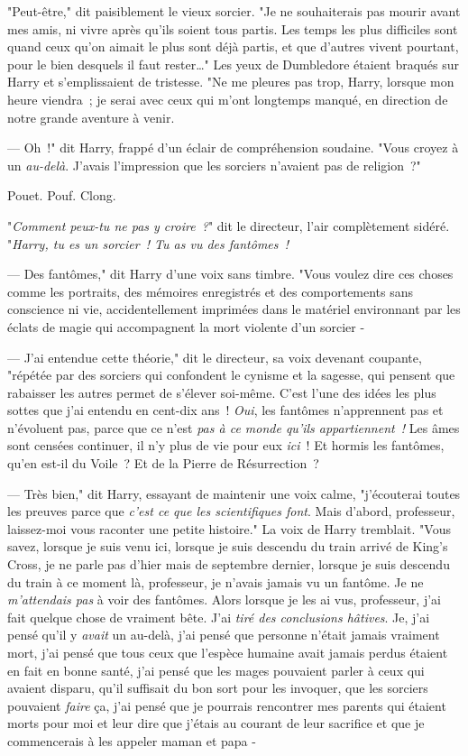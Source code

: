 "Peut-être," dit paisiblement le vieux sorcier. "Je ne souhaiterais pas mourir avant mes amis, ni vivre après qu'ils soient tous partis. Les temps les plus difficiles sont quand ceux qu'on aimait le plus sont déjà partis, et que d'autres vivent pourtant, pour le bien desquels il faut rester…" Les yeux de Dumbledore étaient braqués sur Harry et s'emplissaient de tristesse. "Ne me pleures pas trop, Harry, lorsque mon heure viendra~; je serai avec ceux qui m'ont longtemps manqué, en direction de notre grande aventure à venir.

--- Oh~!" dit Harry, frappé d'un éclair de compréhension soudaine. "Vous croyez à un \emph{au-delà}. J'avais l'impression que les sorciers n'avaient pas de religion~?"

\later

Pouet. Pouf. Clong.

"\emph{Comment peux-tu ne pas y croire~?}" dit le directeur, l'air complètement sidéré. "\emph{Harry, tu es un sorcier~! Tu as vu des fantômes~!}

--- Des fantômes," dit Harry d'une voix sans timbre. "Vous voulez dire ces choses comme les portraits, des mémoires enregistrés et des comportements sans conscience ni vie, accidentellement imprimées dans le matériel environnant par les éclats de magie qui accompagnent la mort violente d'un sorcier -

--- J'ai entendue cette théorie," dit le directeur, sa voix devenant coupante, "répétée par des sorciers qui confondent le cynisme et la sagesse, qui pensent que rabaisser les autres permet de s'élever soi-même. C'est l'une des idées les plus sottes que j'ai entendu en cent-dix ans~! \emph{Oui}, les fantômes n'apprennent pas et n'évoluent pas, parce que ce n'est \emph{pas à ce monde qu'ils appartiennent~!} Les âmes sont censées continuer, il n'y plus de vie pour eux \emph{ici}~! Et hormis les fantômes, qu'en est-il du Voile~? Et de la Pierre de Résurrection~?

--- Très bien," dit Harry, essayant de maintenir une voix calme, "j'écouterai toutes les preuves parce que \emph{c'est ce que les scientifiques font}. Mais d'abord, professeur, laissez-moi vous raconter une petite histoire." La voix de Harry tremblait. "Vous savez, lorsque je suis venu ici, lorsque je suis descendu du train arrivé de King's Cross, je ne parle pas d'hier mais de septembre dernier, lorsque je suis descendu du train à ce moment là, professeur, je n'avais jamais vu un fantôme. Je ne \emph{m'attendais pas} à voir des fantômes. Alors lorsque je les ai vus, professeur, j'ai fait quelque chose de vraiment bête. J'ai \emph{tiré des conclusions hâtives}. Je, j'ai pensé qu'il y \emph{avait} un au-delà, j'ai pensé que personne n'était jamais vraiment mort, j'ai pensé que tous ceux que l'espèce humaine avait jamais perdus étaient en fait en bonne santé, j'ai pensé que les mages pouvaient parler à ceux qui avaient disparu, qu'il suffisait du bon sort pour les invoquer, que les sorciers pouvaient \emph{faire} ça, j'ai pensé que je pourrais rencontrer mes parents qui étaient morts pour moi et leur dire que j'étais au courant de leur sacrifice et que je commencerais à les appeler maman et papa -

